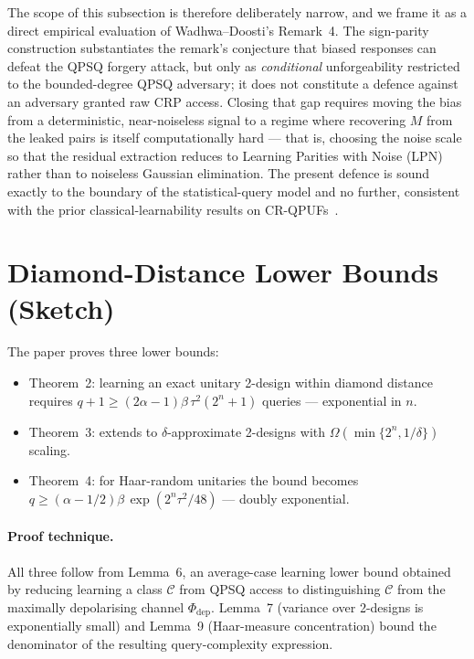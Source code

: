 \documentclass[11pt]{article}
\begin{document}
The scope of this subsection is therefore deliberately narrow, and we frame it
as a direct empirical evaluation of Wadhwa--Doosti's Remark~4. The sign-parity
construction substantiates the remark's conjecture that biased responses can
defeat the QPSQ forgery attack, but only as \emph{conditional} unforgeability
restricted to the bounded-degree QPSQ adversary; it does not constitute a
defence against an adversary granted raw CRP access. Closing that gap requires
moving the bias from a deterministic, near-noiseless signal to a regime where
recovering $M$ from the leaked pairs is itself computationally hard --- that is,
choosing the noise scale so that the residual extraction reduces to Learning
Parities with Noise (LPN) rather than to noiseless Gaussian elimination. The
present defence is sound exactly to the boundary of the statistical-query model
and no further, consistent with the prior classical-learnability results on
CR-QPUFs~\cite{pirnay2022crqpuf}.

\section{Diamond-Distance Lower Bounds (Sketch)}\label{sec:lowerbound}

The paper proves three lower bounds:
\begin{itemize}[leftmargin=*]
  \item Theorem~2: learning an exact unitary 2-design within diamond
        distance requires $q + 1 \ge (2\alpha-1)\beta\,\tau^2(2^n+1)$
        queries --- exponential in $n$.
  \item Theorem~3: extends to $\delta$-approximate 2-designs with
        $\Omega(\min\{2^n, 1/\delta\})$ scaling.
  \item Theorem~4: for Haar-random unitaries the bound becomes
        $q \ge (\alpha-1/2)\beta\, \exp(2^n\tau^2/48)$ --- doubly
        exponential.
\end{itemize}

\paragraph{Proof technique.}
All three follow from Lemma~6, an average-case learning lower bound
obtained by reducing learning a class $\mathcal{C}$ from QPSQ access
to distinguishing $\mathcal{C}$ from the maximally depolarising
channel $\Phi_{\mathrm{dep}}$. Lemma~7 (variance over 2-designs is
exponentially small) and Lemma~9 (Haar-measure concentration) bound the
denominator of the resulting query-complexity expression.
\end{document}
